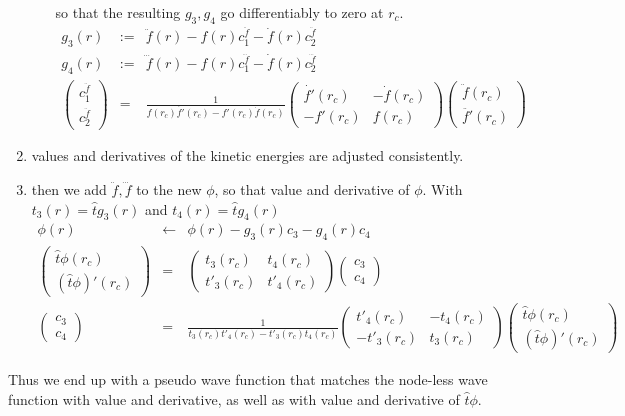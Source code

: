 \documentclass[11pt,a4paper]{report}
\begin{document}
\begin{enumerate}
\begin{enumerate}
  so that the resulting $g_3,g_4$ go differentiably to zero at $r_c$.
\begin{eqnarray}
g_3(r)&:=&\ddot{f}(r)-f(r) c_1^{\ddot{f}}-\dot{f}(r)c_2^{\ddot{f}}
\nonumber\\
g_4(r)&:=&\dddot{f}(r)-f(r) c_1^{\dddot{f}}-\dot{f}(r)c_2^{\dddot{f}}
\nonumber\\
\left(\begin{array}{c}c^{\ddot{f}}_1\\c^{\ddot{f}}_2\end{array}\right)
&=&
\frac{1}{f(r_c)\dot{f'}(r_c)-f'(r_c)\dot{f}(r_c)}
\left(\begin{array}{cc}\dot{f'}(r_c)&-\dot{f}(r_c)\\-f'(r_c)&f(r_c)\end{array}\right)
\left(\begin{array}{c}\ddot{f}(r_c)\\\ddot{f'}(r_c)\end{array}\right)
\end{eqnarray}
\end{enumerate}
\item values and derivatives of the kinetic energies are adjusted
  consistently.
\item then we add $\ddot{f},\dddot{f}$ to the new $\phi$, so that
  value and derivative of $\phi$. With $t_3(r)=\hat{t}g_3(r)$ and
  $t_4(r)=\hat{t}g_4(r)$
\begin{eqnarray}
\phi(r)&\leftarrow&\phi(r)-g_3(r)c_3 - g_4(r)c_4
\nonumber\\
\left(\begin{array}{c}
\hat{t}\phi(r_c)
\\
(\hat{t}\phi)'(r_c)
\end{array}\right)
&=&
\left(\begin{array}{cc}t_3(r_c)&t_4(r_c)\\
t'_3(r_c)&t'_4(r_c)\end{array}\right)
\left(\begin{array}{c}c_3\\c_4\end{array}\right)
\nonumber\\
\left(\begin{array}{c}c_3\\c_4\end{array}\right)
&=&
\frac{1}{t_3(r_c)t'_4(r_c)-t'_3(r_c)t_4(r_c)}
\left(\begin{array}{cc}t'_4(r_c)&-t_4(r_c)\\
-t'_3(r_c)&t_3(r_c)\end{array}\right)
\left(\begin{array}{c}\hat{t}\phi(r_c)\\(\hat{t}\phi)'(r_c)\end{array}\right)
\end{eqnarray}
\end{enumerate}
Thus we end up with a pseudo wave function that matches the node-less
wave function with value and derivative, as well as with value and
derivative of $\hat{t}\phi$.
\end{document}
